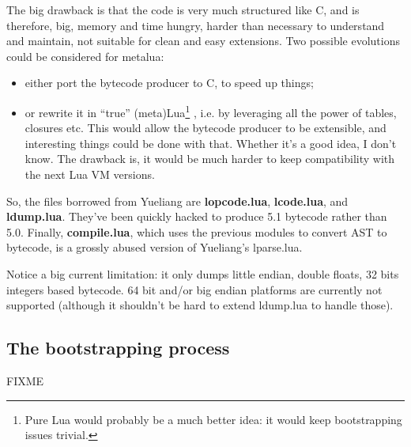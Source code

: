 The big drawback is that the code is very much structured like C, and
is therefore, big, memory and time hungry, harder than necessary to
understand and maintain, not suitable for clean and easy
extensions. Two possible evolutions could be considered for metalua:

\begin{itemize}
\item either port the bytecode producer to C, to speed up things;
\item or rewrite it in ``true'' (meta)Lua\footnote{Pure Lua would
    probably be a much better idea: it would keep bootstrapping issues
    trivial.} , i.e. by leveraging all the power of tables, closures
  etc. This would allow the bytecode producer to be extensible, and
  interesting things could be done with that. Whether it's a good
  idea, I don't know. The drawback is, it would be much harder to keep
  compatibility with the next Lua VM versions.
\end{itemize}

So, the files borrowed from Yueliang are {\bf lopcode.lua}, {\bf
  lcode.lua}, and {\bf ldump.lua}. They've been quickly hacked to
produce 5.1 bytecode rather than 5.0. Finally, {\bf compile.lua},
which uses the previous modules to convert AST to bytecode, is a
grossly abused version of Yueliang's lparse.lua.

Notice a big current limitation: it only dumps little endian, double
floats, 32 bits integers based bytecode. 64 bit and/or big endian
platforms are currently not supported (although it shouldn't be hard
to extend ldump.lua to handle those).
 
\subsection{The bootstrapping process}

FIXME